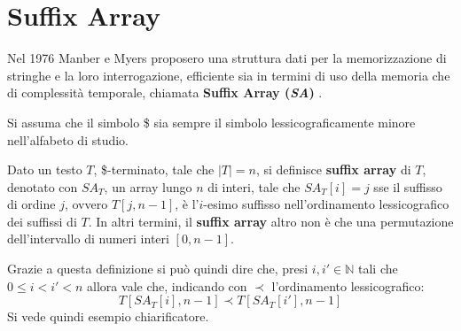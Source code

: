 \section{Suffix Array}
Nel 1976 Manber e Myers proposero una struttura dati per la memorizzazione di
stringhe e la loro interrogazione, efficiente sia in termini di uso della
memoria che di complessità temporale, chiamata \textbf{Suffix Array
  (\textit{SA})} \cite{sa}.
\begin{shaded}
  \noindent
  Si assuma che il simbolo \$ sia sempre il simbolo lessicograficamente minore
  nell'alfabeto di studio.
\end{shaded}
\begin{definizione}
  Dato un testo $T$, \$-terminato, tale che $|T|=n$, si definisce \textbf{suffix
    array} di $T$, denotato con $SA_T$, un array lungo $n$ di interi, tale che
  $SA_T[i]=j$ sse il suffisso di ordine $j$, ovvero $T[j,n-1]$, è
  l'$i$-esimo suffisso nell’ordinamento lessicografico dei suffissi di $T$. In
  altri termini, il \textbf{suffix array} altro non è che una permutazione
  dell'intervallo di numeri interi $[0,n-1]$.
\end{definizione}
Grazie a questa definizione si può quindi dire che, presi $i,i'\in \mathbb{N}$
tali che $0\leq i < i' < n$ allora vale che, indicando con $\prec$
l'ordinamento lessicografico:
\[T[SA_T[i],n-1] \prec T[SA_T[i'],n-1]\]
Si vede quindi esempio chiarificatore.
